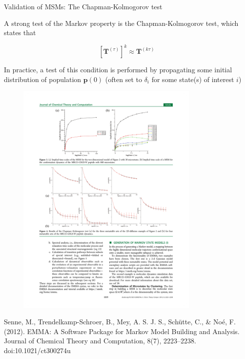\documentclass{beamer}
\begin{document}
\begin{frame}{Validation of MSMs: The Chapman-Kolmogorov test}

A strong test of the Markov property is the Chapman-Kolmogorov test, which states that

$$[\mathbf{T}^{(\tau)} ]^k \approx \mathbf{T}^{(k \tau)} $$

In practice, a test of this condition is performed by propagating some initial distribution of population $\mathbf{p}(0)$ (often set to $\delta_i$ for some state(s) of interest $i$)


\begin{figure}
\includegraphics[width=0.8\textwidth]{CK-MR121}
\end{figure}


\tiny
Senne, M., Trendelkamp-Schroer, B., Mey, A. S. J. S., Sch\"{u}tte, C., \& No\'{e}, F. (2012). EMMA: A Software Package for Markov Model Building and Analysis. Journal of Chemical Theory and Computation, 8(7), 2223–2238. doi:10.1021/ct300274u
\normalsize

\end{frame}
\end{document}
